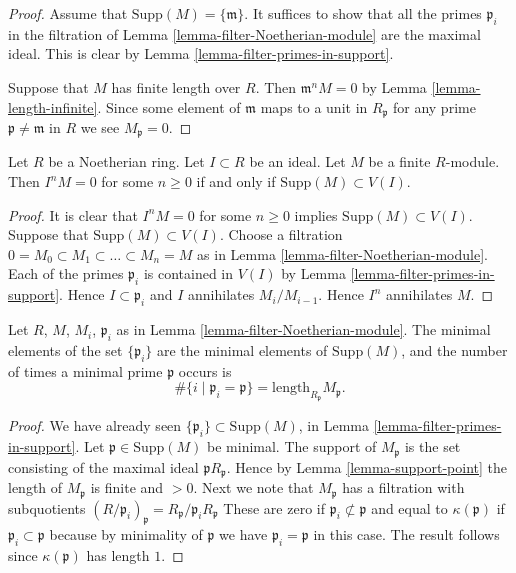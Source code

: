 \begin{proof}
Assume that $\text{Supp}(M) = \{ \mathfrak m\}$.
It suffices to show that all the primes $\mathfrak p_i$
in the filtration of Lemma \ref{lemma-filter-Noetherian-module}
are the maximal ideal. This is clear by
Lemma \ref{lemma-filter-primes-in-support}.

\medskip\noindent
Suppose that $M$ has finite length over $R$.
Then $\mathfrak m^n M = 0$ by Lemma \ref{lemma-length-infinite}.
Since some element of $\mathfrak m$ maps to a unit
in $R_{\mathfrak p}$ for any prime
$\mathfrak p \not = \mathfrak m$ in $R$ we see $M_{\mathfrak p} = 0$.
\end{proof}

\begin{lemma}
\label{lemma-Noetherian-power-ideal-kills-module}
Let $R$ be a Noetherian ring.
Let $I \subset R$ be an ideal.
Let $M$ be a finite $R$-module.
Then $I^nM = 0$ for some $n \geq 0$ if and only if
$\text{Supp}(M) \subset V(I)$.
\end{lemma}

\begin{proof}
It is clear that $I^nM = 0$ for some $n \geq 0$ implies
$\text{Supp}(M) \subset V(I)$. Suppose that $\text{Supp}(M) \subset V(I)$.
Choose a filtration $0 = M_0 \subset M_1 \subset \ldots \subset M_n = M$
as in Lemma \ref{lemma-filter-Noetherian-module}. Each of the primes
$\mathfrak p_i$ is contained in $V(I)$ by
Lemma \ref{lemma-filter-primes-in-support}.
Hence $I \subset \mathfrak p_i$ and $I$ annihilates $M_i/M_{i - 1}$.
Hence $I^n$ annihilates $M$.
\end{proof}

\begin{lemma}
\label{lemma-filter-minimal-primes-in-support}
Let $R$, $M$, $M_i$, $\mathfrak p_i$ as in
Lemma \ref{lemma-filter-Noetherian-module}.
The minimal elements of the set $\{\mathfrak p_i\}$
are the minimal elements of $\text{Supp}(M)$, and
the number of times a minimal prime $\mathfrak p$
occurs is
$$
\#\{i \mid \mathfrak p_i = \mathfrak p\}
=
\text{length}_{R_\mathfrak p} M_{\mathfrak p}.
$$
\end{lemma}

\begin{proof}
We have already seen $\{\mathfrak p_i\} \subset \text{Supp}(M)$,
in Lemma \ref{lemma-filter-primes-in-support}.
Let $\mathfrak p \in \text{Supp}(M)$ be minimal.
The support of $M_{\mathfrak p}$ is the set
consisting of the maximal ideal $\mathfrak p R_{\mathfrak p}$.
Hence by Lemma \ref{lemma-support-point} the length
of $M_{\mathfrak p}$ is finite and $>0$. Next we
note that $M_{\mathfrak p}$ has a filtration with subquotients
$
(R/\mathfrak p_i)_{\mathfrak p}
=
R_{\mathfrak p}/{\mathfrak p_i}R_{\mathfrak p}
$
These are zero if $\mathfrak p_i \not \subset \mathfrak p$
and equal to $\kappa(\mathfrak p)$ if $\mathfrak p_i \subset
\mathfrak p$ because by minimality of $\mathfrak p$
we have $\mathfrak p_i = \mathfrak p$ in this case.
The result follows since $\kappa(\mathfrak p)$ has length $1$.
\end{proof}


